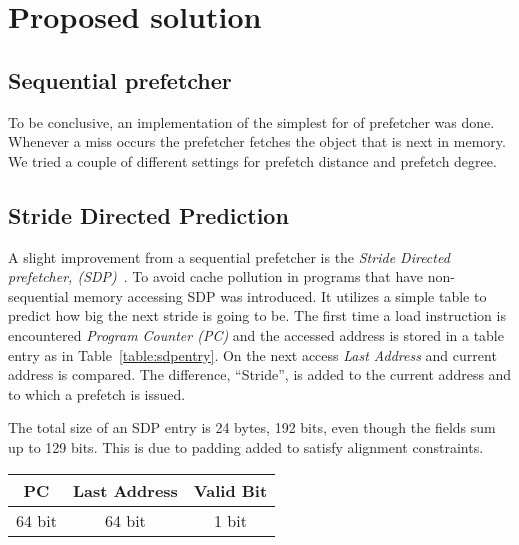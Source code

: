 \section{Proposed solution}


\subsection{Sequential prefetcher}
To be conclusive, an implementation of the simplest for of prefetcher
was done. Whenever a miss occurs the prefetcher fetches the object
that is next in memory. We tried a couple of different settings for
prefetch distance and prefetch degree.

\subsection{Stride Directed Prediction}
A slight improvement from a sequential prefetcher is the
\textit{Stride Directed prefetcher, (SDP)}~\cite{sdp}.
To avoid cache pollution in programs that have non-sequential memory
accessing SDP was introduced. It utilizes a simple table to
predict how big the next stride is going to be. The first time a load
instruction is encountered \textit{Program Counter (PC)} and the
accessed address is stored in a table entry as in
Table~\ref{table:sdpentry}. On the next access \textit{Last Address}
and current address is compared. The difference, ``Stride'', is added
to the current address and to which a prefetch is issued.

The total size of an SDP entry is 24 bytes, 192 bits, even though the
fields sum up to 129 bits. This is due to padding added to satisfy
alignment constraints.

\begin{center}
  \begin{tabular}{ | c | c | c |}
    \hline
    PC & Last Address & Valid Bit \\ \hline
    64 bit & 64 bit & 1 bit \\ \hline
  \end{tabular}
  \label{table:sdpentry}
\end{center}


